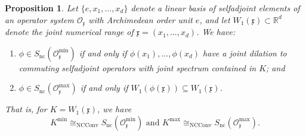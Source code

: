 \documentclass{amsart}
\newtheorem{proposition}[theorem]{Proposition}
\theoremstyle{definition}
\theoremstyle{remark}
\numberwithin{equation}{section}
\begin{document}
\begin{proposition}\label{min-max-ncs} Let $\{e,x_1,\dots,x_d\}$ denote a linear basis of selfadjoint elements
of an operator system $\mathcal O_{\mathfrak x}$ with Archimedean order unit $e$, and
let $W_1(\mathfrak x)\subset\mathbb R^d$ denote the joint numerical range of
$\mathfrak x=(x_1,\dots,x_d)$.
We have:
\begin{enumerate}
\item $\phi\in S_{\textrm{nc}}(\mathcal O_{\mathfrak x}^{\textrm{min}})$ if and only if 
$\phi(x_1),\dots,\phi(x_d)$ have a joint dilation to commuting selfadjoint operators with
joint spectrum contained in $K$; and
\item $\phi\in S_{\textrm{nc}}(\mathcal O_{\mathfrak x}^{\textrm{max}})$ if and only if $W_1(\phi(\mathfrak x))\subseteq W_1(\mathfrak x)$.
\end{enumerate}
That is, for $K=W_1(\mathfrak x)$, we have
\[
K^{\textrm{min}}\cong_{\textrm{NCConv}} S_{\textrm{nc}}(\mathcal O_{\mathfrak x}^{\textrm{min}}) \mbox{ and }
K^{\textrm{max}}\cong_{\textrm{NCConv}} S_{\textrm{nc}}(\mathcal O_{\mathfrak x}^{\textrm{max}}).
\]
\end{proposition}
\end{document}
